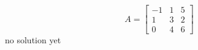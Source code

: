 {
\[A=
\begin{bmatrix}
	-1 & 1 & 5 \\
	1 & 3 & 2 \\
	0 & 4 & 6
\end{bmatrix}
\]
}
{
no solution yet
}
